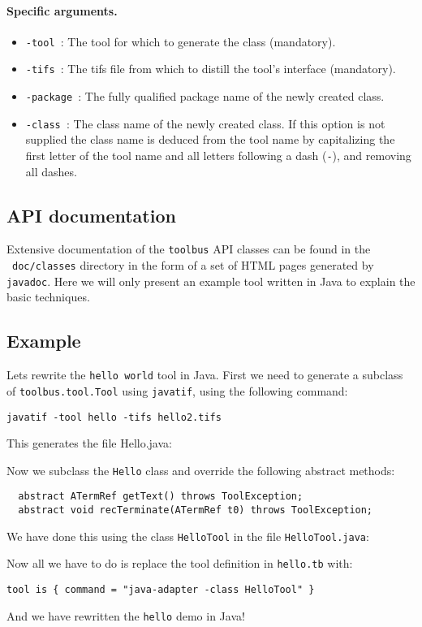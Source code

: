 \paragraph{Specific arguments.}
\begin{itemize}
\item {\tt -tool }: The tool for which to generate the class (mandatory).
\item {\tt -tifs }: The tifs file from which to distill the tool's interface
	(mandatory).
\item {\tt -package }: The fully qualified package name of the newly
	created class.
\item {\tt -class }: The class name of the newly created class. If this
    	option is not supplied the class name is deduced from the tool name
	by capitalizing the first letter of the tool name and all letters
	following a dash ({\tt -}), and removing all dashes.
\end{itemize}

\subsection{API documentation}

Extensive documentation of the {\tt toolbus} API classes can be found
in the \TB\ {\tt doc/classes} directory in the form of a set of HTML
pages generated by {\tt javadoc}. Here we will only present an example
tool written in Java to explain the basic techniques.

\subsection{Example}

Lets rewrite the {\tt hello world} tool in Java. First we need to
generate a subclass of {\tt toolbus.tool.Tool} using {\tt javatif},
using the following command:

\begin{verbatim}
javatif -tool hello -tifs hello2.tifs
\end{verbatim}

This generates the file Hello.java:



Now we subclass the {\tt Hello} class and override the following 
abstract methods:

\begin{verbatim}
  abstract ATermRef getText() throws ToolException;
  abstract void recTerminate(ATermRef t0) throws ToolException;
\end{verbatim}

We have done this using the class {\tt HelloTool} in the
file {\tt HelloTool.java}:



Now all we have to do is replace the tool definition in {\tt hello.tb}
with:

\begin{verbatim}
tool is { command = "java-adapter -class HelloTool" }
\end{verbatim}

And we have rewritten the {\tt hello} demo in Java!
